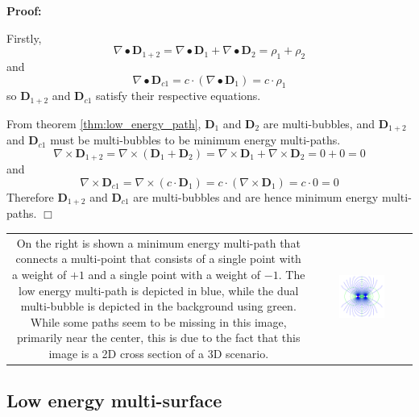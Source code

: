 \textbf{Proof:}

Firstly, 
\[\nabla \bullet \mathbf{D}_{1+2} = \nabla \bullet \mathbf{D}_1 + \nabla \bullet \mathbf{D}_2 = \rho_1 + \rho_2\]
and 
\[\nabla \bullet \mathbf{D}_{c1} = c \cdot (\nabla \bullet \mathbf{D}_1) = c \cdot \rho_1\]
so \(\mathbf{D}_{1+2}\) and \(\mathbf{D}_{c1}\) satisfy their respective equations.

From theorem \ref{thm:low_energy_path}, \(\mathbf{D}_1\) and \(\mathbf{D}_2\) are multi-bubbles, and \(\mathbf{D}_{1+2}\) and \(\mathbf{D}_{c1}\) must be multi-bubbles to be minimum energy multi-paths. 
\[\nabla \times \mathbf{D}_{1+2} = \nabla \times (\mathbf{D}_1 + \mathbf{D}_2) = \nabla \times \mathbf{D}_1 + \nabla \times \mathbf{D}_2 = 0 + 0 = 0\]
and 
\[\nabla \times \mathbf{D}_{c1} = \nabla \times (c \cdot \mathbf{D}_1) = c \cdot (\nabla \times \mathbf{D}_1) = c \cdot 0 = 0\]
Therefore \(\mathbf{D}_{1+2}\) and \(\mathbf{D}_{c1}\) are multi-bubbles and are hence minimum energy multi-paths. \(\Box\)

\begin{tabular}{cc}
\parbox{0.5\textwidth}{
On the right is shown a minimum energy multi-path that connects a multi-point that consists of a single point with a weight of \(+1\) and a single point with a weight of \(-1\). The low energy multi-path is depicted in blue, while the dual multi-bubble is depicted in the background using green. While some paths seem to be missing in this image, primarily near the center, this is due to the fact that this image is a 2D cross section of a 3D scenario.
} & \parbox{0.5\textwidth}{
\includegraphics[width = 0.5\textwidth]{Duality/primary_multi-path_with_simple_balanced_multi-point_3}
}
\end{tabular}




\subsection{Low energy multi-surface}

